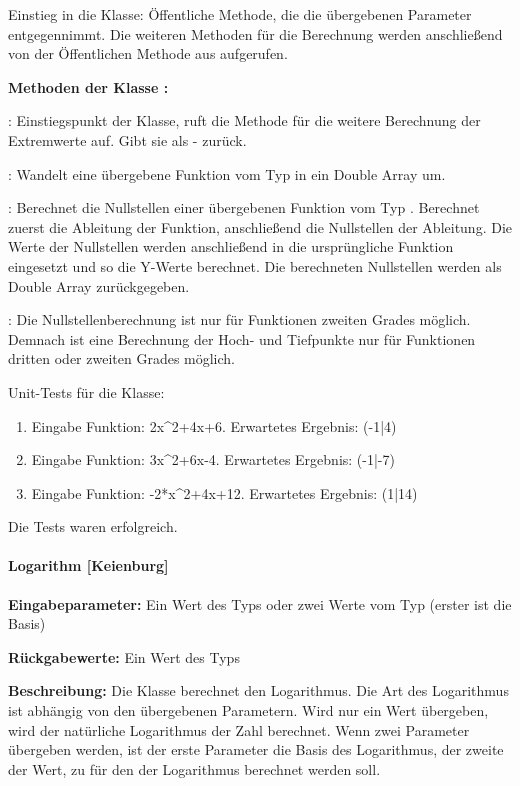 Einstieg in die Klasse: Öffentliche Methode, die die übergebenen Parameter entgegennimmt. Die weiteren Methoden für die Berechnung werden anschließend von der Öffentlichen Methode aus aufgerufen. 

\textbf{Methoden der Klasse :}

: Einstiegspunkt der Klasse, ruft die Methode \linebreak{} für die weitere Berechnung der Extremwerte auf. Gibt sie als - zurück. 

: Wandelt eine übergebene Funktion vom Typ  in ein Double Array um.

: Berechnet die Nullstellen einer übergebenen Funktion vom Typ . Berechnet zuerst die Ableitung der Funktion, anschließend die Nullstellen der Ableitung. Die Werte der Nullstellen werden anschließend in die ursprüngliche Funktion eingesetzt und so die Y-Werte berechnet. Die berechneten Nullstellen werden als Double Array zurückgegeben. 

: Die Nullstellenberechnung ist nur für Funktionen zweiten Grades möglich. Demnach ist eine Berechnung der Hoch- und Tiefpunkte nur für Funktionen dritten oder zweiten Grades möglich.

Unit-Tests für die Klasse:

\begin{enumerate}
\item Eingabe Funktion: 2x\^{}2+4x+6. Erwartetes Ergebnis: (-1|4)
\item Eingabe Funktion: 3x\^{}2+6x-4. Erwartetes Ergebnis: (-1|-7)
\item Eingabe Funktion: -2*x\^{}2+4x+12. Erwartetes Ergebnis: (1|14)
\end{enumerate}

Die Tests waren erfolgreich.

\paragraph{Logarithm [Keienburg]}

\textbf{Eingabeparameter:} Ein Wert des Typs  oder zwei Werte vom Typ  (erster ist die Basis) 

\textbf{Rückgabewerte:} Ein Wert des Typs 

\textbf{Beschreibung:} Die Klasse berechnet den Logarithmus. Die Art des Logarithmus ist abhängig von den übergebenen Parametern. Wird nur ein Wert übergeben, wird der natürliche Logarithmus der Zahl berechnet. Wenn zwei Parameter übergeben werden, ist der erste Parameter die Basis des Logarithmus, der zweite der Wert, zu für den der Logarithmus berechnet werden soll. 

